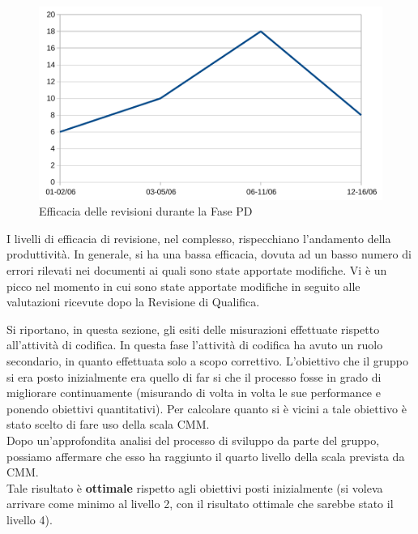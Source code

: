 			\begin{figure}[H]
				\centering
				\includegraphics[width=12cm]{PianoDiQualifica/Pics/EfficaciaRevisioniFasePD.pdf}
				\caption{Efficacia delle revisioni durante la Fase PD}
			\end{figure}

			I livelli di efficacia di revisione, nel complesso, rispecchiano l'andamento della produttività. In generale, si ha una bassa efficacia, dovuta ad un basso numero di errori rilevati nei documenti ai quali sono state apportate modifiche. Vi è un picco nel momento in cui sono state apportate modifiche in seguito alle valutazioni ricevute dopo la Revisione di Qualifica.

		Si riportano, in questa sezione, gli esiti delle misurazioni effettuate rispetto all'attività di codifica. In questa fase l'attività di codifica ha avuto un ruolo secondario, in quanto effettuata solo a scopo correttivo.
				L'obiettivo che il gruppo si era posto inizialmente era quello di far si che il processo fosse in grado di migliorare continuamente (misurando di volta in volta le sue performance e ponendo obiettivi quantitativi). Per calcolare quanto si è vicini a tale obiettivo è stato scelto di fare uso della scala CMM.\\
				Dopo un'approfondita analisi del processo di sviluppo da parte del gruppo, possiamo affermare che esso ha raggiunto il quarto livello della scala prevista da CMM.\\
				Tale risultato è \textbf{ottimale} rispetto agli obiettivi posti inizialmente (si voleva arrivare come minimo al livello 2, con il risultato ottimale che sarebbe stato il livello 4).
			
